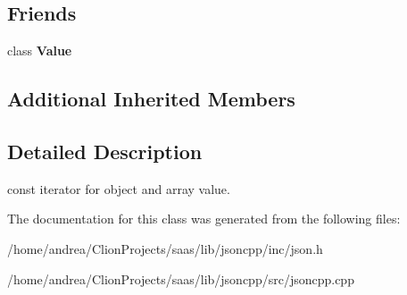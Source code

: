 \subsection*{Friends}
\begin{DoxyCompactItemize}
\item 
class {\bfseries Value}\hypertarget{class_json_1_1_value_const_iterator_aeceedf6e1a7d48a588516ce2b1983d6f}{}\label{class_json_1_1_value_const_iterator_aeceedf6e1a7d48a588516ce2b1983d6f}

\end{DoxyCompactItemize}
\subsection*{Additional Inherited Members}


\subsection{Detailed Description}
const iterator for object and array value. 



The documentation for this class was generated from the following files\+:\begin{DoxyCompactItemize}
\item 
/home/andrea/\+Clion\+Projects/saas/lib/jsoncpp/inc/json.\+h\item 
/home/andrea/\+Clion\+Projects/saas/lib/jsoncpp/src/jsoncpp.\+cpp\end{DoxyCompactItemize}
